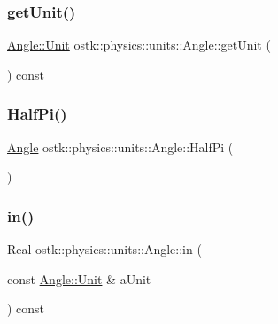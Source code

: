 \mbox{\label{classostk_1_1physics_1_1units_1_1_angle_abe7e90d80d24d15464a6041569196ea3}} 
\subsubsection{\texorpdfstring{get\+Unit()}{getUnit()}}
{\footnotesize\ttfamily \hyperlink{classostk_1_1physics_1_1units_1_1_angle_aea1f8018b1d378b9dee56959d8eb9def}{Angle\+::\+Unit} ostk\+::physics\+::units\+::\+Angle\+::get\+Unit (\begin{DoxyParamCaption}{ }\end{DoxyParamCaption}) const}

\mbox{\label{classostk_1_1physics_1_1units_1_1_angle_a6065318d10aee4f99d28af429a64d9bb}} 
\subsubsection{\texorpdfstring{Half\+Pi()}{HalfPi()}}
{\footnotesize\ttfamily \hyperlink{classostk_1_1physics_1_1units_1_1_angle}{Angle} ostk\+::physics\+::units\+::\+Angle\+::\+Half\+Pi (\begin{DoxyParamCaption}{ }\end{DoxyParamCaption})\hspace{0.3cm}{\ttfamily [static]}}

\mbox{\label{classostk_1_1physics_1_1units_1_1_angle_a80e7aa75986fc9b4644b6d0db4f3ba9c}} 
\subsubsection{\texorpdfstring{in()}{in()}}
{\footnotesize\ttfamily Real ostk\+::physics\+::units\+::\+Angle\+::in (\begin{DoxyParamCaption}\item[{const \hyperlink{classostk_1_1physics_1_1units_1_1_angle_aea1f8018b1d378b9dee56959d8eb9def}{Angle\+::\+Unit} \&}]{a\+Unit }\end{DoxyParamCaption}) const}


